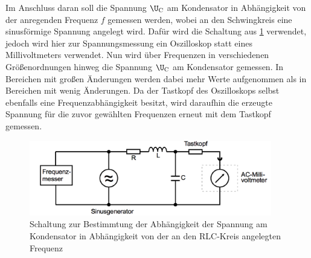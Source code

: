 Im Anschluss daran soll die Spannung $\U_{\text{C}}$ am Kondensator in Abhängigkeit
von der anregenden Frequenz $f$ gemessen werden, wobei an den Schwingkreis eine
sinusförmige Spannung angelegt wird. Dafür wird die Schaltung aus \ref{fig:aufbau_3} verwendet,
jedoch wird hier zur Spannungsmessung ein Oszilloskop statt eines Millivoltmeters
verwendet. Nun wird über Frequenzen in verschiedenen Größenordnungen hinweg die
Spannung $\U_{\text{C}}$  am Kondensator gemessen. In Bereichen mit großen Änderungen
 werden dabei mehr Werte aufgenommen als in Bereichen mit wenig Änderungen.
Da der Tastkopf des Oszilloskops selbst ebenfalls eine Frequenzabhängigkeit besitzt,
wird daraufhin die erzeugte Spannung für die zuvor gewählten Frequenzen erneut mit
dem Tastkopf gemessen.
\begin{figure}
  \centering
  \includegraphics[width=300pt]{data/aufbau_3.png}
  \caption{Schaltung zur Bestimmtung der Abhängigkeit der Spannung am Kondensator
  in Abhängigkeit von der an den RLC-Kreis angelegten Frequenz\cite{Versuchsanleitung1}}
  \label{fig:aufbau_3}
\end{figure}


